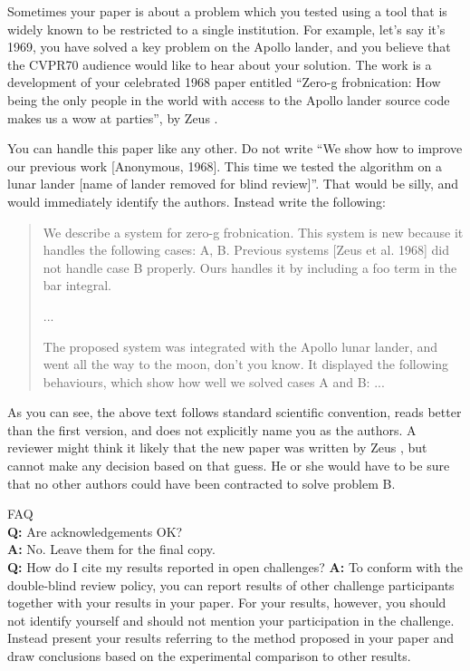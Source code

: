 \documentclass[10pt,twocolumn,letterpaper]{article}
\begin{document}
Sometimes your paper is about a problem which you tested using a tool that is widely known to be restricted to a single institution.
For example, let's say it's 1969, you have solved a key problem on the Apollo lander, and you believe that the CVPR70 audience would like to hear about your
solution.
The work is a development of your celebrated 1968 paper entitled ``Zero-g frobnication: How being the only people in the world with access to the Apollo lander source code makes us a wow at parties'', by Zeus \etal.

You can handle this paper like any other.
Do not write ``We show how to improve our previous work [Anonymous, 1968].
This time we tested the algorithm on a lunar lander [name of lander removed for blind review]''.
That would be silly, and would immediately identify the authors.
Instead write the following:
\begin{quotation}
\noindent
   We describe a system for zero-g frobnication.
   This system is new because it handles the following cases:
   A, B.  Previous systems [Zeus et al. 1968] did not  handle case B properly.
   Ours handles it by including a foo term in the bar integral.

   ...

   The proposed system was integrated with the Apollo lunar lander, and went all the way to the moon, don't you know.
   It displayed the following behaviours, which show how well we solved cases A and B: ...
\end{quotation}
As you can see, the above text follows standard scientific convention, reads better than the first version, and does not explicitly name you as the authors.
A reviewer might think it likely that the new paper was written by Zeus \etal, but cannot make any decision based on that guess.
He or she would have to be sure that no other authors could have been contracted to solve problem B.
\medskip

\noindent
FAQ\medskip\\
{\bf Q:} Are acknowledgements OK?\\
{\bf A:} No.  Leave them for the final copy.\medskip\\
{\bf Q:} How do I cite my results reported in open challenges?
{\bf A:} To conform with the double-blind review policy, you can report results of other challenge participants together with your results in your paper.
For your results, however, you should not identify yourself and should not mention your participation in the challenge.
Instead present your results referring to the method proposed in your paper and draw conclusions based on the experimental comparison to other results.\medskip\\
\end{document}
